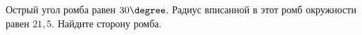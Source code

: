 \begin{ex}
	\begin{condition}
		Острый угол ромба равен \( 30 \degree\). Радиус вписанной в этот ромб окружности равен \( 21,5 \). Найдите сторону ромба.
	\end{condition}
\end{ex}